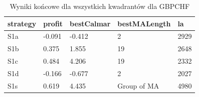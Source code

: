 \newpage
 \begin{table}[t!]
\caption{Wyniki końcowe dla wszystkich kwadrantów dla GBPCHF}
 \begin{center} 
 \begin{tabular}{|l|l|l|l|l|} 
 \hline \textbf{strategy} & \textbf{profit} & \textbf{bestCalmar} & \textbf{bestMALength} & \textbf{la} \\ \hline  
S1a & -0.091 & -0.412 & 2 & 2929\\ \hline 
S1b & 0.375 & 1.855 & 19 & 2648\\ \hline 
S1c & 0.484 & 4.206 & 19 & 2332\\ \hline 
S1d & -0.166 & -0.677 & 2 & 2027\\ \hline 
S1s & 0.619 & 4.435 & Group of MA & 4980\\ 
\hline \end{tabular} 
 \end{center} 
 \end{table}
\FloatBarrier
